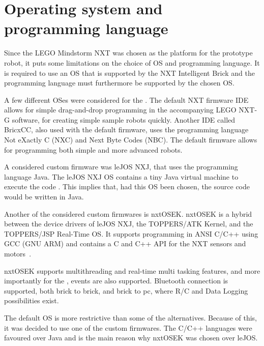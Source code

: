 \section{Operating system and programming language} \label{sec:os_and_proglanguage}
Since the LEGO Mindstorm NXT was chosen as the platform for the prototype robot, it puts some limitations on the choice of OS and programming language. It is required to use an OS that is supported by the NXT Intelligent Brick and the programming language must furthermore be supported by the chosen OS.

A few different OSes were considered for the \projname{}. The default NXT firmware IDE allows for simple drag-and-drop programming in the accompanying LEGO NXT-G software, for creating simple sample robots quickly. Another IDE called BricxCC, also used with the default firmware, uses the programming language Not eXactly C (NXC) and Next Byte Codes (NBC). The default firmware allows for programming both simple and more advanced robots. 

A considered custom firmware was leJOS NXJ, that uses the programming language Java. The leJOS NXJ OS contains a tiny Java virtual machine to execute the code \citep{lejos}. This implies that, had this OS been chosen, the source code would be written in Java.

Another of the considered custom firmwares is nxtOSEK. nxtOSEK is a hybrid between the device drivers of leJOS NXJ, the TOPPERS/ATK Kernel, and the TOPPERS/JSP Real-Time OS. It supports programming in ANSI C/C++ using GCC (GNU ARM) and contains a C and C++ API for the NXT sensors and motors~\citep{nxtosek, toppers_atk, toppers_jsp, nxtOSEK2, nxtosek_api}.

nxtOSEK supports multithreading and real-time multi tasking features, and more importantly for the \projname{}, events are also supported. Bluetooth connection is supported, both brick to brick, and brick to pc, where R/C and Data Logging possibilities exist.

The default OS is more restrictive than some of the alternatives. Because of this, it was decided to use one of the custom firmwares. The C/C++ languages were favoured over Java and is the main reason why nxtOSEK was chosen over leJOS.


